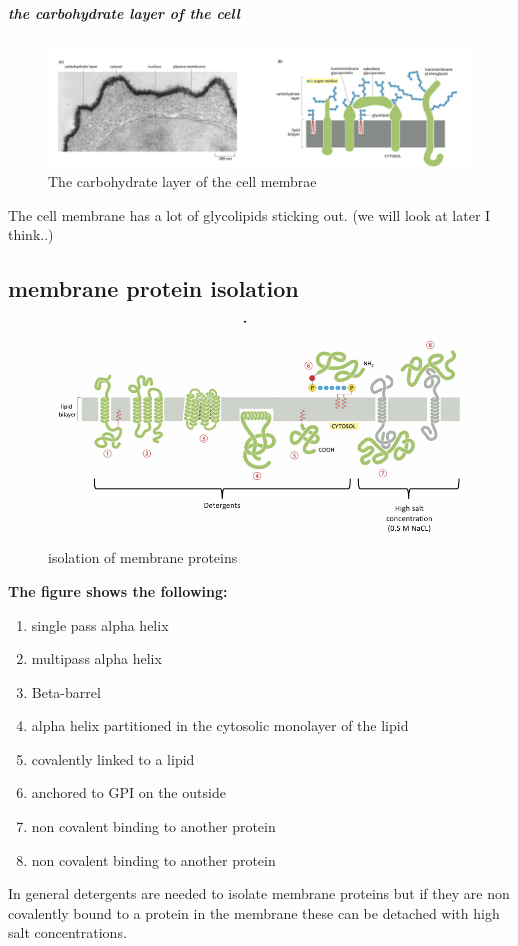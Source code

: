 \documentclass[../main.tex]{subfiles}
\begin{document}
\subparagraph{the carbohydrate layer of the cell}

\begin{figure}[H]
    \centering
    \includegraphics[width=0.5\linewidth]{Carbohydrate_layer.png}
    \caption{The carbohydrate layer of the cell membrae}
    \label{fig:enter-label}
\end{figure}

The cell membrane has a lot of glycolipids sticking out. (we will look at later I think..)


\subsection{membrane protein isolation}
\begin{figure}[H]
    \centering
    \includegraphics[width=0.5\linewidth]{MP_isolation.png}
    \caption{isolation of membrane proteins}
    \label{fig:enter-label}
\end{figure}
\textbf{The figure shows the following:}
\begin{enumerate}
    \item single pass alpha helix
    \item multipass alpha helix
    \item Beta-barrel
    \item alpha helix partitioned in the cytosolic monolayer of the lipid
    \item covalently linked to a lipid
    \item anchored to GPI on the outside
    \item non covalent binding to another protein
    \item non covalent binding to another protein
\end{enumerate}

In general detergents are needed to isolate membrane proteins but if they are non covalently bound to a protein in the membrane these can be detached with high salt concentrations.
\end{document}

